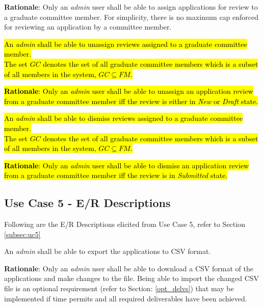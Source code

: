 \documentclass[fontsize=12pt,paper=letter,twoside]{scrartcl}
\begin{document}
\smallskip
\noindent \textbf{Rationale}: Only an \emph{admin} user shall be able to assign applications for review to a graduate committee member. For simplicity, there is no maximum cap enforced for reviewing an application by a committee member.

\rdescription
{\hl{An \emph{admin} shall be able to unassign reviews assigned to a graduate committee member.\\}}
{\hl{The set $GC$ denotes the set of all graduate committee members which is a subset of all members in the system, $GC \subseteq FM$.}}

\smallskip
\noindent \hl{\textbf{Rationale}: Only an \emph{admin} user shall be able to unassign an application review from a graduate committee member iff the review is either in \emph{New} or \emph{Draft} state.}

\rdescription
{\hl{An \emph{admin} shall be able to dismiss reviews assigned to a graduate committee member.\\}}
{\hl{The set $GC$ denotes the set of all graduate committee members which is a subset of all members in the system, $GC \subseteq FM$.}}

\smallskip
\hl{\noindent \textbf{Rationale}: Only an \emph{admin} user shall be able to dismiss an application review from a graduate committee member iff the review is in \emph{Submitted} state.}


\subsection{Use Case 5 - E/R Descriptions}

Following are the E/R Descriptions elicited from Use Case 5, refer to Section \ref{subsec:uc5}

\genreq
{An \emph{admin} shall be able to export the applications to CSV format.\\}
{}
\label{R14}

\smallskip
\noindent \textbf{Rationale}: Only an \emph{admin} user shall be able to download a CSV format of the applications and make changes to the file. Being able to import the changed CSV file is an optional requirement (refer to Section: \ref{opt_delvs}) that may be implemented if time permits and all required deliverables have been achieved.
\end{document}
